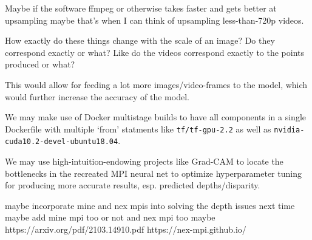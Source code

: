 Maybe if the software ffmpeg or otherwise takes faster and gets better at upsampling maybe that's when I can think of upsampling less-than-720p videos.

How exactly do these things change with the scale of an image? 
Do they correspond exactly or what? Like do the videos correspond exactly to the points produced or what?

This would allow for feeding a lot more images/video-frames to the model, which would further increase the accuracy of the model.

We may make use of Docker multistage builds to have all components in a single Dockerfile with multiple `from' statments like \texttt{tf/tf-gpu-2.2} as well as \texttt{nvidia-cuda10.2-devel-ubuntu18.04}.

We may use high-intuition-endowing projects like Grad-CAM to locate the bottlenecks in the recreated MPI neural net to optimize hyperparameter tuning for producing more accurate results, esp. predicted depths/disparity.

maybe incorporate mine and nex mpis into solving the depth issues next time
maybe add mine mpi too or not	and nex mpi too maybe
https://arxiv.org/pdf/2103.14910.pdf	https://nex-mpi.github.io/